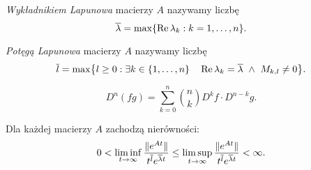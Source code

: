 %
\begin{definition}
  \emph{Wykładnikiem Lapunowa} macierzy $A$ nazywamy liczbę
  \begin{equation*}
    \overline{\lambda} = \max \{ \operatorname{Re} \lambda_k : k = 1, \ldots, n \}.
  \end{equation*}
\end{definition}
%
\begin{definition}
  \emph{Potęgą Lapunowa} macierzy $A$ nazywamy liczbę
  \begin{equation*}
    \overline{l} = \max \bigl\{ l \geq 0 : \exists k \in \{1,\ldots,n\} \quad \operatorname{Re} \lambda_k = \overline{\lambda} 
    \ \wedge \ M_{k,l} \not= 0 \bigr\}.
  \end{equation*}
\end{definition}
%
\begin{lemma}
  \begin{equation} \label{Leibniz}
    D^n(fg) = \sum_{k=0}^n \binom{n}{k} D^k f \cdot D^{n-k} g.
  \end{equation}
\end{lemma}
%
\begin{theorem}
  Dla każdej macierzy $A$ zachodzą nierówności:
%
  \begin{equation*}
    0 < \liminf_{t\to\infty} \frac{ \lVert e^{At}\rVert }{ t^{\overline{l}} e^{\overline{\lambda} t} } \leq
    \limsup_{t\to\infty} \frac{ \lVert e^{At}\rVert }{ t^{\overline{l}} e^{\overline{\lambda} t} } < \infty.
  \end{equation*}
\end{theorem}
%
